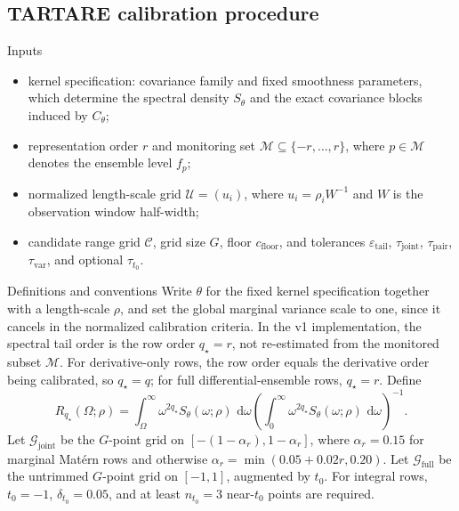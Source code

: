 \documentclass[11pt,a4paper]{article}
\theoremstyle{definition}
\theoremstyle{remark}
\newcommand{\diff}{\,\mathrm d}
\begin{document}
\subsection{TARTARE calibration procedure}\label{appendix:tartare-procedure}

\begin{tartarenote}{Inputs}
\begin{itemize}[nosep]
\item kernel specification: covariance family and fixed smoothness parameters, which determine the spectral density \(S_\theta\) and the exact covariance blocks induced by \(C_\theta\);
\item representation order \(r\) and monitoring set \(\mathcal M\subseteq\{-r,\ldots,r\}\), where \(p\in\mathcal M\) denotes the ensemble level \(f_p\);
\item normalized length-scale grid \(\mathcal U=(u_i)\), where \(u_i=\rho_iW^{-1}\) and \(W\) is the observation window half-width;
\item candidate range grid \(\mathcal C\), grid size \(G\), floor \(c_{\mathrm{floor}}\), and tolerances \(\varepsilon_{\mathrm{tail}}\), \(\tau_{\mathrm{joint}}\), \(\tau_{\mathrm{pair}}\), \(\tau_{\mathrm{var}}\), and optional \(\tau_{t_0}\).
\end{itemize}
\end{tartarenote}

\begin{tartarenote}{Definitions and conventions}
Write \(\theta\) for the fixed kernel specification together with a length-scale \(\rho\), and set the global marginal variance scale to one, since it cancels in the normalized calibration criteria. In the v1 implementation, the spectral tail order is the row order \(q_\star=r\), not re-estimated from the monitored subset \(\mathcal M\). For derivative-only rows, the row order equals the derivative order being calibrated, so \(q_\star=q\); for full differential-ensemble rows, \(q_\star=r\). Define
\[
R_{q_\star}(\Omega;\rho)
=
\int_{\Omega}^{\infty}\omega^{2q_\star}S_\theta(\omega;\rho)\,\diff\omega
\left(\int_0^{\infty}\omega^{2q_\star}S_\theta(\omega;\rho)\,\diff\omega\right)^{-1}.
\]
Let \(\mathcal G_{\mathrm{joint}}\) be the \(G\)-point grid on \([-(1-\alpha_r),1-\alpha_r]\), where \(\alpha_r=0.15\) for marginal Mat\'ern rows and otherwise \(\alpha_r=\min(0.05+0.02r,0.20)\). Let \(\mathcal G_{\mathrm{full}}\) be the untrimmed \(G\)-point grid on \([-1,1]\), augmented by \(t_0\). For integral rows, \(t_0=-1\), \(\delta_{t_0}=0.05\), and at least \(n_{t_0}=3\) near-\(t_0\) points are required.
\end{tartarenote}
\end{document}
